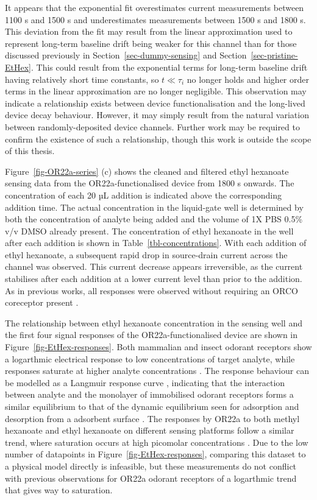 \documentclass[
  a4paper,
]{scrbook}
\begin{document}
It appears that the exponential fit overestimates current measurements
between 1100 s and 1500 s and underestimates measurements between 1500 s
and 1800 s. This deviation from the fit may result from the linear
approximation used to represent long-term baseline drift being weaker
for this channel than for those discussed previously in
Section~\ref{sec-dummy-sensing} and Section~\ref{sec-pristine-EtHex}.
This could result from the exponential terms for long-term baseline
drift having relatively short time constants, so \(t\ll\tau_i\) no
longer holds and higher order terms in the linear approximation are no
longer negligible. This observation may indicate a relationship exists
between device functionalisation and the long-lived device decay
behaviour. However, it may simply result from the natural variation
between randomly-deposited device channels. Further work may be required
to confirm the existence of such a relationship, though this work is
outside the scope of this thesis.

Figure~\ref{fig-OR22a-series} (c) shows the cleaned and filtered ethyl
hexanoate sensing data from the OR22a-functionalised device from 1800 s
onwards. The concentration of each 20 µL addition is indicated above the
corresponding addition time. The actual concentration in the liquid-gate
well is determined by both the concentration of analyte being added and
the volume of 1X PBS 0.5\% v/v DMSO already present. The concentration
of ethyl hexanoate in the well after each addition is shown in
Table~\ref{tbl-concentrations}. With each addition of ethyl hexanoate, a
subsequent rapid drop in source-drain current across the channel was
observed. This current decrease appears irreversible, as the current
stabilises after each addition at a lower current level than prior to
the addition. As in previous works, all responses were observed without
requiring an ORCO coreceptor present
\autocite{Murugathas2019a,Murugathas2020,Khadka2019,Cheema2021}.

The relationship between ethyl hexanoate concentration in the sensing
well and the first four signal responses of the OR22a-functionalised
device are shown in Figure~\ref{fig-EtHex-responses}. Both mammalian and
insect odorant receptors show a logarthmic electrical response to low
concentrations of target analyte, while responses saturate at higher
analyte concentrations
\autocite{Persaud1982,Jin2012,Kwon2015,Yoo2022,Khadka2019,Murugathas2020,Cheema2021}.
The response behaviour can be modelled as a Langmuir response curve
\autocite{Jin2012,Kwon2015,Yoo2022}, indicating that the interaction
between analyte and the monolayer of immobilised odorant receptors forms
a similar equilibrium to that of the dynamic equilibrium seen for
adsorption and desorption from a adsorbent surface
\autocite{Ayawei2017}. The responses by OR22a to both methyl hexanoate
and ethyl hexanoate on different sensing platforms follow a similar
trend, where saturation occurs at high picomolar concentrations
\autocite{Murugathas2020,Cheema2021}. Due to the low number of
datapoints in Figure~\ref{fig-EtHex-responses}, comparing this dataset
to a physical model directly is infeasible, but these measurements do
not conflict with previous observations for OR22a odorant receptors of a
logarthmic trend that gives way to saturation.
\end{document}
